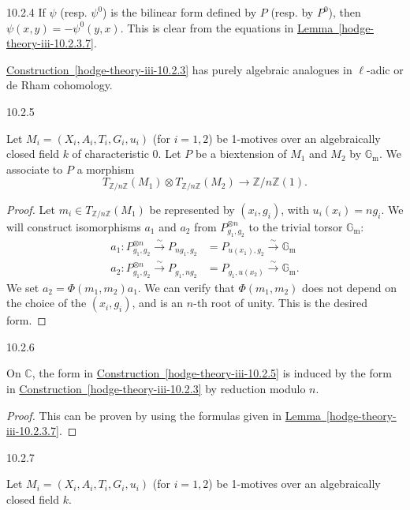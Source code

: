 \begin{remark}{10.2.4}
    If \(\psi \) (resp. \(\psi ^0\)) is the bilinear form defined by \(P\) (resp. by \(P^0\)), then \(\psi (x,y)=-\psi ^0(y,x)\).
    This is clear from the equations in \hyperref[hodge-theory-iii-10.2.3.7]{Lemma~\ref*{hodge-theory-iii-10.2.3.7}}.\par{}\hyperref[hodge-theory-iii-10.2.3]{Construction~\ref*{hodge-theory-iii-10.2.3}} has purely algebraic analogues in \(\ell \)-adic or de Rham cohomology.\end{remark}\begin{construction}{10.2.5}\label{hodge-theory-iii-10.2.5}\skipsinglepar\par{}Let \(M_i=(X_i,A_i,T_i,G_i,u_i)\) (for \(i=1,2\)) be 1-motives over an algebraically closed field \(k\) of characteristic 0.
    Let \(P\) be a biextension of \(M_1\) and \(M_2\) by \(\mathbb {G}_\mathrm {m}\).
    We associate to \(P\) a morphism
    \[       T_{\mathbb {Z}{/}n\mathbb {Z}}(M_1)\otimes  T_{\mathbb {Z}{/}n\mathbb {Z}}(M_2)       \to  \mathbb {Z}{/}n\mathbb {Z}(1).     \]\begin{proof}\par{}Let \(m_i\in  T_{\mathbb {Z}{/}n\mathbb {Z}}(M_1)\) be represented by \((x_i,g_i)\), with \(u_i(x_i)=ng_i\).
      We will construct isomorphisms \(a_1\) and \(a_2\) from \(P_{g_1,g_2}^{\otimes  n}\) to the trivial torsor \(\mathbb {G}_\mathrm {m}\):
      \[         \begin {aligned}           a_1\colon  P_{g_1,g_2}^{\otimes  n}           \xrightarrow {\sim } P_{ng_1,g_2}           &= P_{u(x_1),g_2}           \xrightarrow {\sim } \mathbb {G}_\mathrm {m}         \\a_2\colon  P_{g_1,g_2}^{\otimes  n}           \xrightarrow {\sim } P_{g_1,ng_2}           &= P_{g_1,u(x_2)}           \xrightarrow {\sim } \mathbb {G}_\mathrm {m}.         \end {aligned}       \]
      We set \(a_2=\Phi (m_1,m_2)a_1\).
      We can verify that \(\Phi (m_1,m_2)\) does not depend on the choice of the \((x_i,g_i)\), and is an \(n\)-th root of unity.
      This is the desired form.\end{proof}\end{construction}\begin{proposition}{10.2.6}\label{hodge-theory-iii-10.2.6}\skipsinglepar\par{}On \(\mathbb {C}\), the form in \hyperref[hodge-theory-iii-10.2.5]{Construction~\ref*{hodge-theory-iii-10.2.5}} is induced by the form in \hyperref[hodge-theory-iii-10.2.3]{Construction~\ref*{hodge-theory-iii-10.2.3}} by reduction modulo \(n\).\begin{proof}\par{}This can be proven by using the formulas given in \hyperref[hodge-theory-iii-10.2.3.7]{Lemma~\ref*{hodge-theory-iii-10.2.3.7}}.\end{proof}\end{proposition}\begin{construction}{10.2.7}\label{hodge-theory-iii-10.2.7}\skipsinglepar\par{}Let \(M_i=(X_i,A_i,T_i,G_i,u_i)\) (for \(i=1,2\)) be 1-motives over an algebraically closed field \(k\).

\end{construction}
